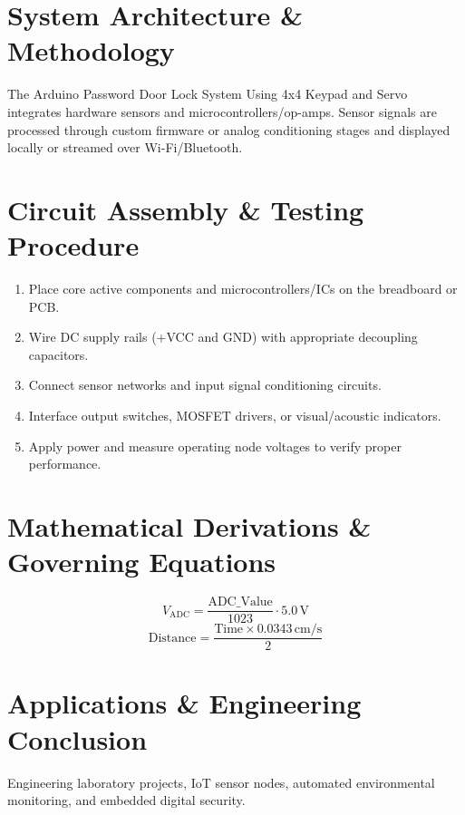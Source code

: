 \documentclass[11pt,a4paper]{article}
\begin{document}
\section{System Architecture \& Methodology}
The Arduino Password Door Lock System Using 4x4 Keypad and Servo integrates hardware sensors and microcontrollers/op-amps. Sensor signals are processed through custom firmware or analog conditioning stages and displayed locally or streamed over Wi-Fi/Bluetooth.

\section{Circuit Assembly \& Testing Procedure}
\begin{enumerate}
    \item Place core active components and microcontrollers/ICs on the breadboard or PCB.
    \item Wire DC supply rails (+VCC and GND) with appropriate decoupling capacitors.
    \item Connect sensor networks and input signal conditioning circuits.
    \item Interface output switches, MOSFET drivers, or visual/acoustic indicators.
    \item Apply power and measure operating node voltages to verify proper performance.
\end{enumerate}

\section{Mathematical Derivations \& Governing Equations}
\begin{equation}
V_{\text{ADC}} = \frac{\text{ADC\_Value}}{1023} \cdot 5.0\,\text{V}
\end{equation}
\begin{equation}
\text{Distance} = \frac{\text{Time} \times 0.0343\,\text{cm/s}}{2}
\end{equation}

\section{Applications \& Engineering Conclusion}
Engineering laboratory projects, IoT sensor nodes, automated environmental monitoring, and embedded digital security.
\end{document}
